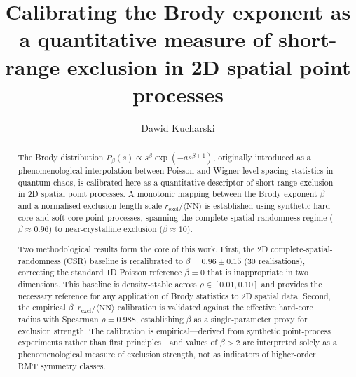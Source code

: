 \documentclass[final,3p,times,twocolumn]{elsarticle}
\theoremstyle{definition}
\begin{document}
\begin{frontmatter}

\title{Calibrating the Brody exponent as a quantitative measure
of short-range exclusion in 2D spatial point processes}

\author[put]{Dawid Kucharski}

\begin{abstract}
The Brody distribution $P_\beta(s)\propto s^\beta\exp(-a s^{\beta+1})$,
originally introduced as a phenomenological interpolation between
Poisson and Wigner level-spacing statistics in quantum chaos, is
calibrated here as a quantitative descriptor of short-range exclusion
in 2D spatial point processes. A monotonic mapping between the Brody
exponent $\beta$ and a normalised exclusion length scale
$r_{\text{excl}}/\langle\text{NN}\rangle$ is established using
synthetic hard-core and soft-core point processes, spanning the
complete-spatial-randomness regime ($\beta\approx0.96$) to
near-crystalline exclusion ($\beta\approx10$).

Two methodological results form the core of this work. First, the 2D
complete-spatial-randomness (CSR) baseline is recalibrated to
$\beta=0.96\pm0.15$ (30 realisations), correcting the standard 1D
Poisson reference $\beta=0$ that is inappropriate in two dimensions.
This baseline is density-stable across $\rho\in[0.01,0.10]$ and
provides the necessary reference for any application of Brody
statistics to 2D spatial data. Second, the empirical
$\beta$--$r_{\text{excl}}/\langle\text{NN}\rangle$ calibration
is validated against the effective hard-core radius with Spearman
$\rho=0.988$, establishing $\beta$ as a single-parameter proxy for
exclusion strength. The calibration is empirical---derived from
synthetic point-process experiments rather than first principles---and
values of $\beta>2$ are interpreted solely as a phenomenological
measure of exclusion strength, not as indicators of higher-order RMT
symmetry classes.


\end{abstract}
\end{frontmatter}
\end{document}
